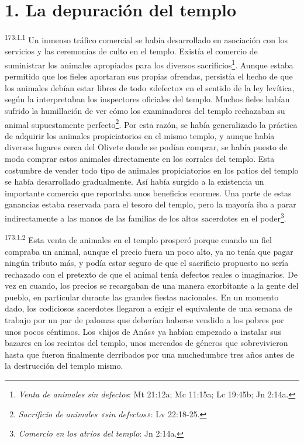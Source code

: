 \section*{1. La depuración del templo}
\par 
\textsuperscript{173:1.1} Un inmenso tráfico comercial se había desarrollado en asociación con los servicios y las ceremonias de culto en el templo. Existía el comercio de suministrar los animales apropiados para los diversos sacrificios\footnote{\textit{Venta de animales sin defectos}: Mt 21:12a; Mc 11:15a; Lc 19:45b; Jn 2:14a.}. Aunque estaba permitido que los fieles aportaran sus propias ofrendas, persistía el hecho de que los animales debían estar libres de todo «defecto» en el sentido de la ley levítica, según la interpretaban los inspectores oficiales del templo. Muchos fieles habían sufrido la humillación de ver cómo los examinadores del templo rechazaban su animal supuestamente perfecto\footnote{\textit{Sacrificio de animales «sin defectos»}: Lv 22:18-25.}. Por esta razón, se había generalizado la práctica de adquirir los animales propiciatorios en el mismo templo, y aunque había diversos lugares cerca del Olivete donde se podían comprar, se había puesto de moda comprar estos animales directamente en los corrales del templo. Esta costumbre de vender todo tipo de animales propiciatorios en los patios del templo se había desarrollado gradualmente. Así había surgido a la existencia un importante comercio que reportaba unos beneficios enormes. Una parte de estas ganancias estaba reservada para el tesoro del templo, pero la mayoría iba a parar indirectamente a las manos de las familias de los altos sacerdotes en el poder\footnote{\textit{Comercio en los atrios del templo}: Jn 2:14a.}.

\par 
\textsuperscript{173:1.2} Esta venta de animales en el templo prosperó porque cuando un fiel compraba un animal, aunque el precio fuera un poco alto, ya no tenía que pagar ningún tributo más, y podía estar seguro de que el sacrificio propuesto no sería rechazado con el pretexto de que el animal tenía defectos reales o imaginarios. De vez en cuando, los precios se recargaban de una manera exorbitante a la gente del pueblo, en particular durante las grandes fiestas nacionales. En un momento dado, los codiciosos sacerdotes llegaron a exigir el equivalente de una semana de trabajo por un par de palomas que deberían haberse vendido a los pobres por unos pocos céntimos. Los «hijos de Anás» ya habían empezado a instalar sus bazares en los recintos del templo, unos mercados de géneros que sobrevivieron hasta que fueron finalmente derribados por una muchedumbre tres años antes de la destrucción del templo mismo.

